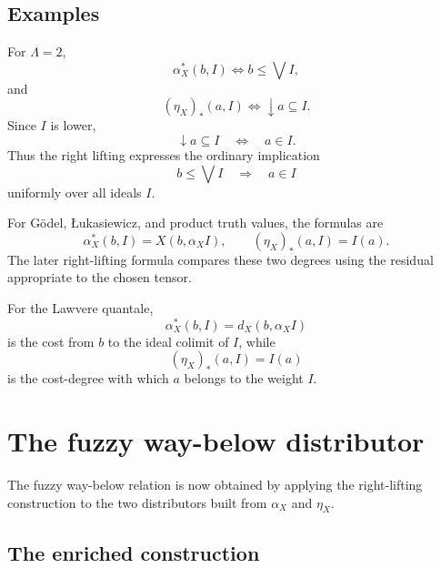 \subsection{Examples}
\label{subsec:ideal-algebra-map-equipment-examples}

\begin{example}
\label{ex:ideal-algebra-map-crisp}
For \(\Lambda=2\),
\[
    \alpha_X^\ast(b,I)
    \Longleftrightarrow
    b\leq \bigvee I,
\]
and
\[
    (\eta_X)_\ast(a,I)
    \Longleftrightarrow
    \downarrow a\subseteq I.
\]
Since \(I\) is lower,
\[
    \downarrow a\subseteq I
    \quad\Longleftrightarrow\quad
    a\in I.
\]
Thus the right lifting expresses the ordinary implication
\[
    b\leq\bigvee I
    \quad\Longrightarrow\quad
    a\in I
\]
uniformly over all ideals \(I\).
\end{example}

\begin{example}
\label{ex:ideal-algebra-map-standard}
For G\"odel, {\L}ukasiewicz, and product truth values, the formulas are
\[
    \alpha_X^\ast(b,I)=X(b,\alpha_X I),
    \qquad
    (\eta_X)_\ast(a,I)=I(a).
\]
The later right-lifting formula compares these two degrees using the residual
appropriate to the chosen tensor.
\end{example}

\begin{example}
\label{ex:ideal-algebra-map-lawvere}
For the Lawvere quantale,
\[
    \alpha_X^\ast(b,I)=d_X(b,\alpha_X I)
\]
is the cost from \(b\) to the ideal colimit of \(I\), while
\[
    (\eta_X)_\ast(a,I)=I(a)
\]
is the cost-degree with which \(a\) belongs to the weight \(I\).
\end{example}

\section{The fuzzy way-below distributor}
\label{sec:fuzzy-way-below-distributor}

The fuzzy way-below relation is now obtained by applying the right-lifting
construction to the two distributors built from \(\alpha_X\) and \(\eta_X\).

\subsection{The enriched construction}
\label{subsec:fuzzy-way-below-enriched}

